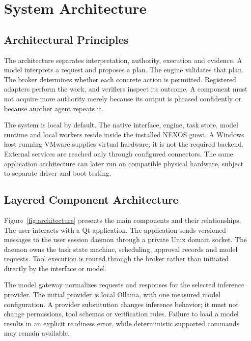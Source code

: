 \chapter{System Architecture}
\section{Architectural Principles}
The architecture separates interpretation, authority, execution and evidence. A model interprets a request and proposes a plan. The engine validates that plan. The broker determines whether each concrete action is permitted. Registered adapters perform the work, and verifiers inspect its outcome. A component must not acquire more authority merely because its output is phrased confidently or because another agent repeats it.

The system is local by default. The native interface, engine, task store, model runtime and local workers reside inside the installed NEXOS guest. A Windows host running VMware supplies virtual hardware; it is not the required backend. External services are reached only through configured connectors. The same application architecture can later run on compatible physical hardware, subject to separate driver and boot testing.


\section{Layered Component Architecture}
Figure~\ref{fig:architecture} presents the main components and their relationships. The user interacts with a Qt application. The application sends versioned messages to the user session daemon through a private Unix domain socket. The daemon owns the task state machine, scheduling, approval records and model requests. Tool execution is routed through the broker rather than initiated directly by the interface or model.


The model gateway normalizes requests and responses for the selected inference provider. The initial provider is local Ollama, with one measured model configuration. A provider substitution changes inference behavior; it must not change permissions, tool schemas or verification rules. Failure to load a model results in an explicit readiness error, while deterministic supported commands may remain available.

